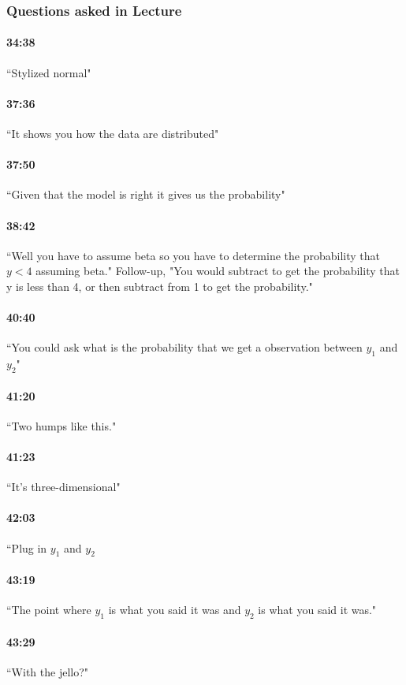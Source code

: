 \documentclass[11pt]{article}
\begin{document}
\subsubsection{Questions asked in Lecture}
\paragraph{34:38} ``Stylized normal"
\paragraph{37:36}  ``It shows you how the data are distributed"
\paragraph{37:50} ``Given that the model is right it gives us the probability"
\paragraph{38:42}  ``Well you have to assume beta so you have to determine the probability that $y<4$ assuming beta."  Follow-up, "You would subtract to get the probability that y is less than 4, or then subtract from 1 to get the probability."
\paragraph{40:40} ``You could ask what is the probability that we get a observation between $y_1$ and $y_2$"
\paragraph{41:20} ``Two humps like this."
\paragraph{41:23} ``It's three-dimensional"
\paragraph{42:03} ``Plug in $y_1$ and $y_2$
\paragraph{43:19} ``The point where $y_1$ is what you said it was and $y_2$ is what you said it was."
\paragraph{43:29} ``With the jello?"
\end{document}

